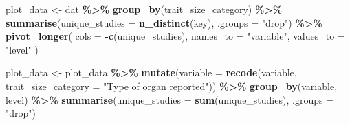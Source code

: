 \documentclass[
]{article}
\newenvironment{Shaded}{\begin{snugshade}}{\end{snugshade}}
\newcommand{\AttributeTok}[1]{\textcolor[rgb]{0.13,0.29,0.53}{#1}}
\newcommand{\FunctionTok}[1]{\textcolor[rgb]{0.13,0.29,0.53}{\textbf{#1}}}
\newcommand{\NormalTok}[1]{#1}
\newcommand{\OtherTok}[1]{\textcolor[rgb]{0.56,0.35,0.01}{#1}}
\newcommand{\SpecialCharTok}[1]{\textcolor[rgb]{0.81,0.36,0.00}{\textbf{#1}}}
\newcommand{\StringTok}[1]{\textcolor[rgb]{0.31,0.60,0.02}{#1}}
\begin{document}
\begin{Shaded}
\begin{Highlighting}[]
\NormalTok{plot\_data }\OtherTok{\textless{}{-}}\NormalTok{ dat }\SpecialCharTok{\%\textgreater{}\%}
  \FunctionTok{group\_by}\NormalTok{(trait\_size\_category) }\SpecialCharTok{\%\textgreater{}\%}
  \FunctionTok{summarise}\NormalTok{(}\AttributeTok{unique\_studies =} \FunctionTok{n\_distinct}\NormalTok{(key), }\AttributeTok{.groups =} \StringTok{"drop"}\NormalTok{) }\SpecialCharTok{\%\textgreater{}\%}
  \FunctionTok{pivot\_longer}\NormalTok{(}
    \AttributeTok{cols =} \SpecialCharTok{{-}}\FunctionTok{c}\NormalTok{(unique\_studies),}
    \AttributeTok{names\_to =} \StringTok{"variable"}\NormalTok{,}
    \AttributeTok{values\_to =} \StringTok{"level"}
\NormalTok{)}

\NormalTok{plot\_data }\OtherTok{\textless{}{-}}\NormalTok{ plot\_data }\SpecialCharTok{\%\textgreater{}\%}
  \FunctionTok{mutate}\NormalTok{(}\AttributeTok{variable =} \FunctionTok{recode}\NormalTok{(variable,}
                           \AttributeTok{trait\_size\_category =} \StringTok{"Type of organ reported"}\NormalTok{)) }\SpecialCharTok{\%\textgreater{}\%}
  \FunctionTok{group\_by}\NormalTok{(variable, level) }\SpecialCharTok{\%\textgreater{}\%}
  \FunctionTok{summarise}\NormalTok{(}\AttributeTok{unique\_studies =} \FunctionTok{sum}\NormalTok{(unique\_studies), }\AttributeTok{.groups =} \StringTok{"drop"}\NormalTok{)}


\end{Highlighting}
\end{Shaded}
\end{document}

